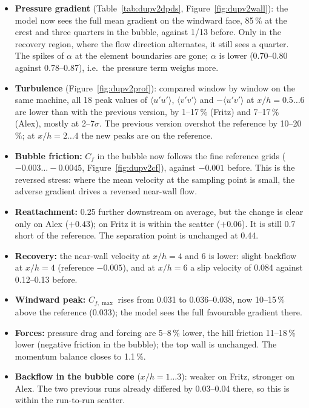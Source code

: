 \documentclass[11pt,a4paper]{article}
\begin{document}
\begin{itemize}
  \item \textbf{Pressure gradient} (Table~\ref{tab:dupv2dpds},
    Figure~\ref{fig:dupv2wall}): the model now sees the full mean gradient
    on the windward face, 85\,\% at the crest and three quarters in the
    bubble, against 1/13 before. Only in the recovery region, where the
    flow direction alternates, it still sees a quarter. The spikes of
    $\alpha$ at the element boundaries are gone; $\alpha$ is lower
    (0.70--0.80 against 0.78--0.87), i.e.\ the pressure term weighs more.
  \item \textbf{Turbulence} (Figure~\ref{fig:dupv2prof}): compared window by
    window on the same machine, all 18 peak values of $\langle u'u'\rangle$,
    $\langle v'v'\rangle$ and $-\langle u'v'\rangle$ at
    $x/h = 0.5\ldots6$ are lower than with the previous version, by
    1--17\,\% (Fritz) and 7--17\,\% (Alex), mostly at 2--7$\sigma$. The
    previous version overshot the reference by 10--20\,\%; at
    $x/h = 2\ldots4$ the new peaks are on the reference.
  \item \textbf{Bubble friction:} $C_f$ in the bubble now follows the fine
    reference grids ($-0.003\ldots-0.0045$, Figure~\ref{fig:dupv2cf}),
    against $-0.001$ before. This is the reversed stress: where the mean
    velocity at the sampling point is small, the adverse gradient drives a
    reversed near-wall flow.
  \item \textbf{Reattachment:} 0.25 further downstream on average, but the
    change is clear only on Alex ($+0.43$); on Fritz it is within the
    scatter ($+0.06$). It is still 0.7 short of the reference. The
    separation point is unchanged at 0.44.
  \item \textbf{Recovery:} the near-wall velocity at $x/h = 4$ and 6 is
    lower: slight backflow at $x/h = 4$ (reference $-0.005$), and at
    $x/h = 6$ a slip velocity of 0.084 against 0.12--0.13 before.
  \item \textbf{Windward peak:} $C_{f,\max}$ rises from 0.031 to
    0.036--0.038, now 10--15\,\% above the reference (0.033); the model sees
    the full favourable gradient there.
  \item \textbf{Forces:} pressure drag and forcing are 5--8\,\% lower, the
    hill friction 11--18\,\% lower (negative friction in the bubble); the top
    wall is unchanged. The momentum balance closes to 1.1\,\%.
  \item \textbf{Backflow in the bubble core} ($x/h = 1\ldots3$): weaker on
    Fritz, stronger on Alex. The two previous runs already differed by
    0.03--0.04 there, so this is within the run-to-run scatter.
\end{itemize}
\end{document}
